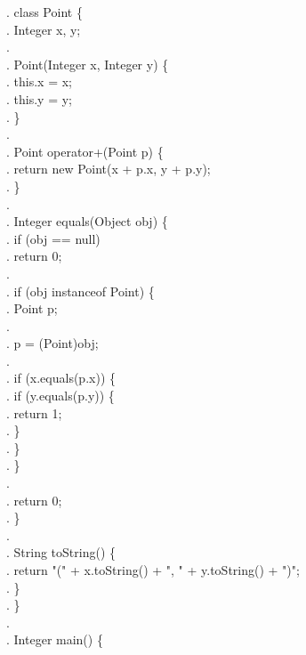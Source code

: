 \begin{figure}
  \small \bnncode
  \codeln. class Point \{ \\
  \codeln. \> Integer x, y; \\
  \codeln. \\
  \codeln. \> Point(Integer x, Integer y) \{ \\
  \codeln. \>\> this.x = x; \\
  \codeln. \>\> this.y = y; \\
  \codeln. \> \} \\
  \codeln. \\
  \codeln. \> Point operator+(Point p) \{ \\
  \codeln. \>\> return new Point(x + p.x, y + p.y); \\
  \codeln. \> \} \\
  \codeln. \\
  \codeln. \> Integer equals(Object obj) \{ \\
  \codeln. \>\> if (obj == null) \\
  \codeln. \>\>\> return 0; \\
  \codeln. \\
  \codeln. \>\> if (obj instanceof Point) \{ \\
  \codeln. \>\>\> Point p; \\
  \codeln. \\
  \codeln. \>\>\> p = (Point)obj; \\
  \codeln. \\
  \codeln. \>\>\> if (x.equals(p.x)) \{ \\
  \codeln. \>\>\>\> if (y.equals(p.y)) \{ \\
  \codeln. \>\>\>\>\> return 1; \\
  \codeln. \>\>\>\> \} \\
  \codeln. \>\>\> \} \\
  \codeln. \>\> \} \\
  \codeln. \\
  \codeln. \>\> return 0; \\
  \codeln. \> \} \\
  \codeln. \\
  \codeln. \> String toString() \{ \\
  \codeln. \>\> return "(" + x.toString() + ", " + y.toString() + ")"; \\
  \codeln. \> \} \\
  \codeln.  \} \\
  \codeln. \\
  \codeln. Integer main() \{ \\

\end{figure}
